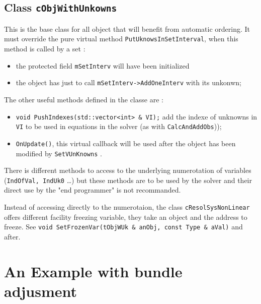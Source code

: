 
\subsection{Class {\tt cObjWithUnkowns}}

\label{ClassOWU}

This is the base class for all object that will benefit from automatic ordering. It must override
the pure virtual method {\tt PutUknowsInSetInterval}, when this method is called by a set :

\begin{itemize}
   \item the protected field {\tt mSetInterv} will have been initialized 
   \item the object has just to call {\tt mSetInterv->AddOneInterv} with its unkonwn;
\end{itemize}

The other useful methods defined in the classe are :

\begin{itemize}
   \item    {\tt void PushIndexes(std::vector<int> \& VI);}  add the indexe of unknowns in  {\tt VI}
            to be used in equations in the solver (as with {\tt CalcAndAddObs}));

   \item    {\tt OnUpdate()}, this virtual callback will be used after the object has been
            modified by   {\tt SetVUnKnowns} .

\end{itemize}

There is different methods to access to the underlying numerotation of variables
({\tt IndOfVal, IndUk0} \dots) but these methods are to be used by the solver and their
direct use by the "end programmer" is not recommanded.

Instead of accessing directly to the numerotaion, the class {\tt cResolSysNonLinear}
 offers different facility freezing variable, they  take an object and the address to freeze.
See {\tt void SetFrozenVar(tObjWUk \& anObj, const Type \& aVal)} and after.


\section{An Example  with bundle adjusment}

